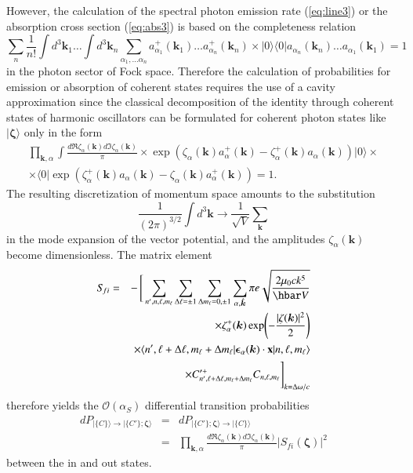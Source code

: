 \documentclass[final,3p,12pt]{elsarticle3}
\begin{document}
However, the calculation of the spectral photon emission rate
(\ref{eq:line3}) or the absorption cross section (\ref{eq:abs3})
is based on the completeness relation
\begin{equation*}
\!\!\!\sum_n\frac{1}{n!}
\int\!d^3\bm{k}_1\ldots\int\!d^3\bm{k}_n
\sum_{\alpha_1,\ldots\alpha_n}a_{\alpha_1}^+(\bm{k}_1)\ldots a_{\alpha_n}^+(\bm{k}_n)
\times\bm{|}0\bm{\rangle}
\bm{\langle} 0\bm{|} a_{\alpha_n}(\bm{k}_n)\ldots a_{\alpha_1}(\bm{k}_1)
=1
\end{equation*}
in the photon sector of Fock space. Therefore the calculation of probabilities
for emission or absorption of coherent states requires the use of a cavity 
approximation since the classical decomposition of the identity through coherent 
states of harmonic oscillators can be formulated for coherent photon states
like $\bm{|}\bm{\zeta}\bm{\rangle}$ only in the form
\begin{multline}\nonumber
\!\!\!\prod_{\bm{k},\alpha}\int\frac{d\Re\zeta_\alpha(\bm{k})
d\Im\zeta_\alpha(\bm{k})}{\pi}
\times\exp\!\left(\zeta_\alpha(\bm{k})a_{\alpha}^+(\bm{k})
-\zeta_{\alpha}^+(\bm{k})a_\alpha(\bm{k})\right)
\bm{|}0\bm{\rangle} \times \\
\label{eq:complete2}
\times \bm{\langle} 0\bm{|}\exp\!\left(\zeta^+_\alpha(\bm{k})a_{\alpha}(\bm{k})
-\zeta_{\alpha}(\bm{k})a^+_\alpha(\bm{k})\right)=1.
\end{multline}
The resulting discretization of momentum space amounts to the
substitution 
\[
\frac{1}{(2\pi)^{3/2}}\int\!d^3\bm{k}\to\frac{1}{\sqrt{V}}\sum_{\bm{k}}
\]
in the mode expansion of the vector potential,
and the amplitudes $\zeta_\alpha(\bm{k})$ become dimensionless.
The matrix element
\begin{eqnarray}\nonumber
S_{\!fi}&=&-\,\Bigg[\sum_{n',n,\ell,m_\ell}\sum_{\Delta\ell=\pm 1}\sum_{\Delta m_\ell=0,\pm 1}
\sum_{\alpha,\hat{\bm{k}}} \pi e\sqrt{\frac{2\mu_0 ck^5}{\hbar V}}
\\ \nonumber
&&\times
\zeta^+_\alpha(\bm{k})
\exp\!\left(-\frac{|\zeta(\bm{k})|^2}{2}\right)
\\ \nonumber
&&\times
\langle n',\ell+\Delta\ell,m_\ell+\Delta m_\ell|
\bm{\epsilon}_\alpha(\bm{k})\cdot\mathrm{\bf x}|n,\ell,m_\ell\rangle
\\ \label{eq:linec4}
&&\times
C'^+_{n',\ell+\Delta\ell,m_\ell+\Delta m_\ell}C_{n,\ell,m_\ell}\Bigg]_{k=\Delta\omega/c}
\end{eqnarray}
therefore yields the $\mathcal{O}(\alpha_S)$ differential
transition probabilities
\begin{eqnarray}\nonumber
dP_{\bm{|}\{C\}\bm{\rangle}\to\bm{|}\{C'\};\bm{\zeta}\bm{\rangle}}&=&
dP_{\bm{|}\{C'\};\bm{\zeta}\bm{\rangle}\to\bm{|}\{C\}\bm{\rangle}}
\\ \label{eq:Pfi}
&=&\prod_{\bm{k},\alpha}\!\frac{d\Re\zeta_\alpha(\bm{k})
d\Im\zeta_\alpha(\bm{k})}{\pi}\!\left|S_{\!fi}(\bm{\zeta})\right|^2
\end{eqnarray}
between the in and out states.
\end{document}
